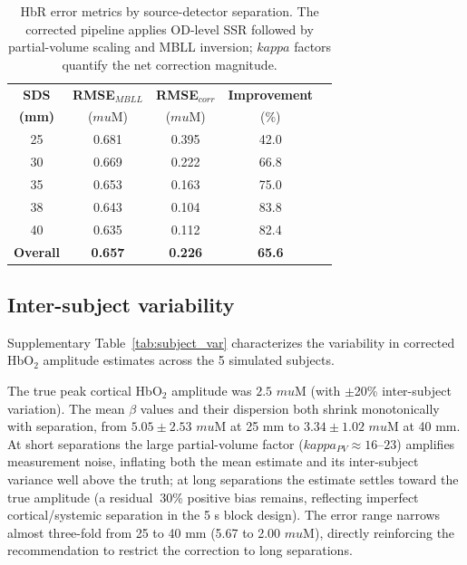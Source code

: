 \documentclass[11pt]{article}
\def\kappa{kappa}%
\def\mu{mu}%
\def\sim{~}%
\def\mathrm#1{#1}%
\def\,{ }%
\begin{document}
\begin{table}[ht]
\centering
\caption{HbR error metrics by source-detector separation. The corrected pipeline applies OD-level SSR followed by partial-volume scaling and MBLL inversion; $\kappa$ factors quantify the net correction magnitude.}
\label{tab:hbr}
\begin{tabular}{@{}ccccc@{}}
\toprule
\textbf{SDS} & \textbf{RMSE}$_{\mathrm{MBLL}}$ & \textbf{RMSE}$_{\mathrm{corr}}$ & \textbf{Improvement} & \\
\textbf{(mm)} & ($\mu$M) & ($\mu$M) & (\%) & \\
\midrule
25 & 0.681 & 0.395 & 42.0 & \\
30 & 0.669 & 0.222 & 66.8 & \\
35 & 0.653 & 0.163 & 75.0 & \\
38 & 0.643 & 0.104 & 83.8 & \\
40 & 0.635 & 0.112 & 82.4 & \\
\midrule
\textbf{Overall} & \textbf{0.657} & \textbf{0.226} & \textbf{65.6} & \\
\bottomrule
\end{tabular}
\end{table}

\subsection{Inter-subject variability}

Supplementary Table~\ref{tab:subject_var} characterizes the variability in corrected HbO$_2$ amplitude estimates across the 5 simulated subjects.



The true peak cortical HbO$_2$ amplitude was $2.5$\,$\mu$M (with $\pm$20\% inter-subject variation). The mean $\beta$ values and their dispersion both shrink monotonically with separation, from $5.05 \pm 2.53$\,$\mu$M at 25\,mm to $3.34 \pm 1.02$\,$\mu$M at 40\,mm. At short separations the large partial-volume factor ($\kappa_{\mathrm{PV}} \approx 16$--$23$) amplifies measurement noise, inflating both the mean estimate and its inter-subject variance well above the truth; at long separations the estimate settles toward the true amplitude (a residual $\sim$30\% positive bias remains, reflecting imperfect cortical/systemic separation in the 5\,s block design). The error range narrows almost three-fold from 25 to 40\,mm (5.67 to 2.00\,$\mu$M), directly reinforcing the recommendation to restrict the correction to long separations.
\end{document}
